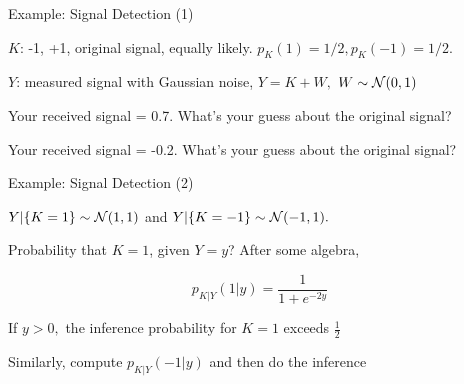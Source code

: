 \begin{frame}{Example: Signal Detection (1)}



\plitemsep 0.01in
\bci

\item<2-> $K$: -1, +1, original signal, equally likely. $p_{K}(1) = 1/2, p_{K}(-1) = 1/2.$
\item<3-> $Y$: measured signal with Gaussian noise, $Y= K+W,$ $W \sim \mathcal N(0,1)$

\medskip
\item<4-> Your received signal = 0.7. What's your guess about the original signal? 
\item<5-> Your received signal = -0.2. What's your guess about the original signal? 

\eci
\end{frame}

\begin{frame}{Example: Signal Detection (2)}

\plitemsep 0.01in
\bci

\item<1-> $Y|\{K=1\} \sim \mathcal N(1,1)$ and $Y|\{K=-1\} \sim \mathcal N(-1,1).$

\item<4-> Probability that $K=1$, given $Y=y$? After some algebra,

{
$$
p_{K|Y}(1|y) = \frac{1}{1+ e^{-2y}}
$$
\bci
\item<6->  If $y >0,$ the inference probability for $K=1$ exceeds $\frac{1}{2}$
\item<7->  Similarly, compute $p_{K|Y}(-1|y)$ and then do the inference
\eci


}
{
\centering
{}
}

\eci

\end{frame}


